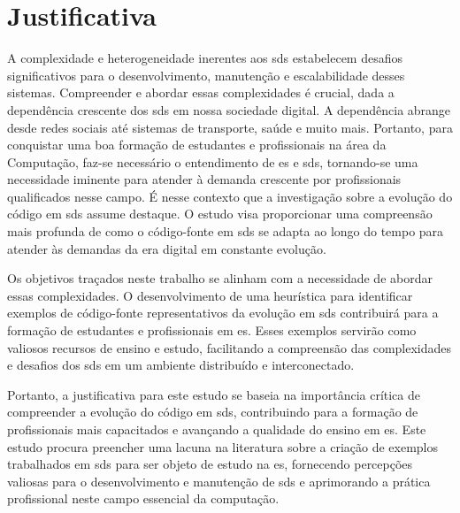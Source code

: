 \section{Justificativa}\label{sec:justificativa}
A complexidade e heterogeneidade inerentes aos \gls{sds} estabelecem desafios significativos para o desenvolvimento, manutenção e escalabilidade desses sistemas. Compreender e abordar essas complexidades é crucial, dada a dependência crescente dos \gls{sds} em nossa sociedade digital. A dependência abrange desde redes sociais até sistemas de transporte, saúde e muito mais. Portanto, para conquistar uma boa formação de estudantes e profissionais na área da Computação, faz-se necessário o entendimento de \gls{es} e \gls{sds}, tornando-se uma necessidade iminente para atender à demanda crescente por profissionais qualificados nesse campo. É nesse contexto que a investigação sobre a evolução do código em \gls{sds} assume destaque. O estudo visa proporcionar uma compreensão mais profunda de como o código-fonte em \gls{sds} se adapta ao longo do tempo para atender às demandas da era digital em constante evolução.

Os objetivos traçados neste trabalho se alinham com a necessidade de abordar essas complexidades. O desenvolvimento de uma heurística para identificar exemplos de código-fonte representativos da evolução em \gls{sds} contribuirá para a formação de estudantes e profissionais em \gls{es}. Esses exemplos servirão como valiosos recursos de ensino e estudo, facilitando a compreensão das complexidades e desafios dos \gls{sds} em um ambiente distribuído e interconectado.

Portanto, a justificativa para este estudo se baseia na importância crítica de compreender a evolução do código em \gls{sds}, contribuindo para a formação de profissionais mais capacitados e avançando a qualidade do ensino em \gls{es}. Este estudo procura preencher uma lacuna na literatura sobre a criação de exemplos trabalhados em \gls{sds} para ser objeto de estudo na \gls{es}, fornecendo percepções valiosas para o desenvolvimento e manutenção de \gls{sds} e aprimorando a prática profissional neste campo essencial da computação.

